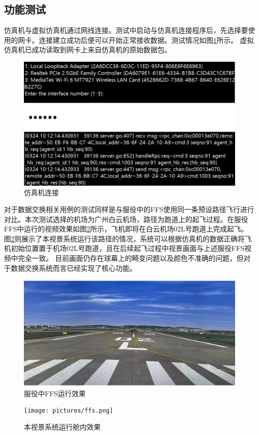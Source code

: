 \subsection{功能测试}
仿真机与虚拟仿真机通过网线连接。测试中启动与仿真机连接程序后，先选择要使用的网卡。连接建立成功后便可以开始正常接收数据。测试情况如图\ref{vsimcon}所示。
虚拟仿真机已成功读取到网卡上来自仿真机的原始数据包。
\begin{figure}[h!]
    \begin{center}
        \includegraphics[width=.8\textwidth]{pictures/maclink.png}
        \caption{仿真机连接}
        \label{vsimcon}
    \end{center}
\end{figure}
\par
对于数据交换相关用例的测试同样是与服役中的FFS使用同一条预设路径飞行进行对比。本次测试选择的机场为广州白云机场，路径为跑道上的起飞过程。在服役FFS中运行的视频效果如图\ref{flightffs}所示，飞机即将在白云机场02L号跑道上完成起飞。
图\ref{flightffs}则展示了本视景系统运行该路径的情况，系统可以根据仿真机的数据正确将飞机初始位置置于机场02L号跑道，且在后续起飞过程中视景画面与上述服役FFS视频中完全一致。
目前画面仍存在球幕上的畸变问题以及颜色不准确的问题，但对于数据交换系统而言已经实现了核心功能。
\begin{figure}[h!]
    \begin{center}
        \includegraphics[width=.8\textwidth]{pictures/ffs2.png}
        \caption{服役中FFS运行效果}
        \label{flightffs}
    \end{center}
\end{figure}
\begin{figure}[h!]
    \begin{center}
        \texttt{[image: pictures/ffs.png]}
        \caption{本视景系统运行舱内效果}
        \label{flighttest}
    \end{center}
\end{figure}
